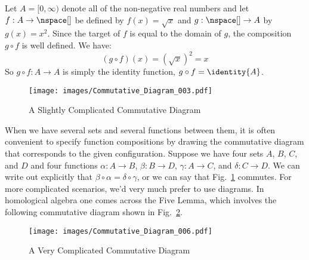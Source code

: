         \begin{example}
            Let $A=[0,\infty)$ denote all of the non-negative real numbers and
            let $f:A\rightarrow\nspace[]$ be defined by $f(x)=\sqrt{x}$ and
            $g:\nspace[]\rightarrow{A}$ by $g(x)=x^{2}$. Since the target of $f$
            is equal to the domain of $g$, the composition $g\circ{f}$ is well
            defined. We have:
            \begin{equation}
                (g\circ{f})(x)=(\sqrt{x})^{2}=x
            \end{equation}
            So $g\circ{f}:A\rightarrow{A}$ is simply the identity function,
            $g\circ{f}=\identity{A}$.
        \end{example}
        \begin{minipage}[t]{0.35\textwidth}
            \begin{figure}[H]
                \centering
                \captionsetup{type=figure}
                \texttt{[image: images/Commutative\_Diagram\_003.pdf]}
                \caption{A Slightly Complicated Commutative Diagram}
                \label{fig:Commutative_Diagram_Func_Comp_002}
            \end{figure}
        \end{minipage}
        \hfill
        \begin{minipage}[t]{0.60\textwidth}
            When we have several sets and several functions between them, it is
            often convenient to specify function compositions by drawing the
            commutative diagram that corresponds to the given configuration.
            Suppose we have four sets $A$, $B$, $C$, and $D$ and four functions
            $\alpha:A\rightarrow{B}$, $\beta:B\rightarrow{D}$,
            $\gamma:A\rightarrow{C}$, and $\delta:C\rightarrow{D}$. We can write out
            explicitly that $\beta\circ\alpha=\delta\circ\gamma$, or we can say that
            Fig.~\ref{fig:Commutative_Diagram_Func_Comp_002} commutes. For more
            complicated scenarios, we'd very much prefer to use diagrams. In
            homological algebra one comes across the Five
            Lemma, which involves the following
            commutative diagram shown in
            Fig.~\ref{fig:Commutative_Diagram_Func_Comp_003}.
        \end{minipage}
        \begin{figure}[H]
            \centering
            \captionsetup{type=figure}
            \texttt{[image: images/Commutative\_Diagram\_006.pdf]}
            \caption{A Very Complicated Commutative Diagram}
            \label{fig:Commutative_Diagram_Func_Comp_003}
        \end{figure}
